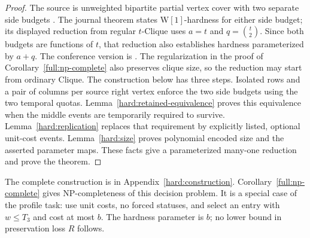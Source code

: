 \begin{proof}
The source is unweighted bipartite partial vertex cover with two separate
side budgets \cite[Definition~5 and Theorem~10]{mkrtchyan2024}.
The journal theorem states \(\mathrm{W}[1]\)-hardness for either side
budget; its displayed reduction from regular \(t\)-Clique uses
\(a=t\) and \(q=\binom{t}{2}\). Since both budgets are functions of
\(t\), that reduction also establishes hardness parameterized by
\(a+q\). The conference version is \cite[Theorem~6]{mkrtchyan2020}.
The regularization in the proof of Corollary~\ref{full:np-complete}
also preserves clique size, so the reduction may start from ordinary Clique.
The construction below has three steps.
Isolated rows and a pair of columns per source right vertex enforce the
two side budgets using the two temporal quotas.
Lemma~\ref{hard:retained-equivalence} proves this equivalence when the
middle events are temporarily required to survive.
Lemma~\ref{hard:replication} replaces that requirement by explicitly listed,
optional unit-cost events. Lemma~\ref{hard:size} proves polynomial encoded
size and the asserted parameter maps. These facts give a parameterized
many-one reduction and prove the theorem.
\end{proof}


The complete construction is in Appendix~\ref{hard:construction}.
Corollary~\ref{full:np-complete} gives NP-completeness of this decision
problem. It is a special case of the profile task: use unit costs, no
forced statuses, and select an entry with $w\le T_3$ and cost at most $b$.
The hardness parameter is $b$; no lower bound in preservation loss $R$ follows.
